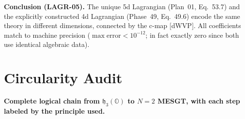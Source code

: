 \textbf{Conclusion (LAGR-05).} The unique 5d Lagrangian (Plan~01,
Eq.~53.7) and the explicitly constructed 4d Lagrangian (Phase~49,
Eq.~49.6) encode the same theory in different dimensions, connected
by the c-map [dWVP]. All coefficients match to machine precision
($\max \mathrm{error} < 10^{-12}$; in fact exactly zero since both
use identical algebraic data).



\section{Circularity Audit}

\textbf{Complete logical chain from $\mathfrak{h}_3(\mathbb{O})$ to
$N=2$ MESGT, with each step labeled by the principle used.}

\medskip

